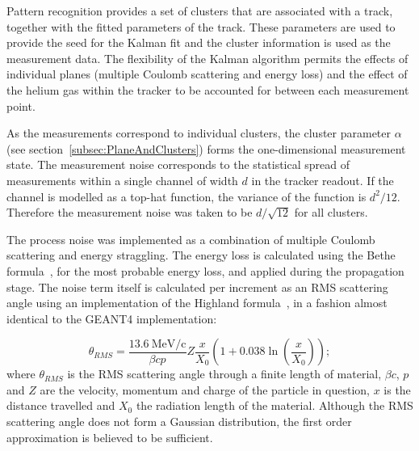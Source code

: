     Pattern recognition provides a set of clusters that are associated with a track, together with the fitted parameters of the track. These parameters are used to provide the seed for the Kalman fit and the cluster information is used as the measurement data. The flexibility of the Kalman algorithm permits the effects of individual planes (multiple Coulomb scattering and energy loss) and the effect of the helium gas within the tracker to be accounted for between each measurement point.
    
    As the measurements correspond to individual clusters, the cluster parameter $\alpha$ (see section~\ref{subsec:PlaneAndClusters}) forms the one-dimensional measurement state. The measurement noise corresponds to the statistical spread of measurements within a single channel of width $d$ in the tracker readout. If the channel is modelled as a top-hat function, the variance of the function is $d^2/12$. Therefore the measurement noise was taken to be $d/\sqrt{12}$ for all clusters.

    The process noise was implemented as a combination of multiple Coulomb scattering and energy straggling. The energy loss is calculated using the Bethe formula~\cite{PDG}, for the most probable energy loss, and applied during the propagation stage. The noise term itself is calculated per increment as an RMS scattering angle using an implementation of the Highland formula~\cite{Highland}, in a fashion almost identical to the GEANT4 implementation:

    \begin{equation}
      \theta_{RMS} = \frac{13.6\ \textrm{MeV/c}}{\beta c p} Z \frac{x}{X_0}\left( 1 + 0.038 \ln\left(\frac{x}{X_0} \right)\right);
      \label{equ:highland_formula}
    \end{equation}
    where $\theta_{RMS}$ is the RMS scattering angle through a finite length of material, $\beta c$, $p$ and $Z$ are the velocity, momentum and charge of the particle in question, $x$ is the distance travelled and $X_0$ the radiation length of the material. Although the RMS scattering angle does not form a Gaussian distribution, the first order approximation is believed to be sufficient.


